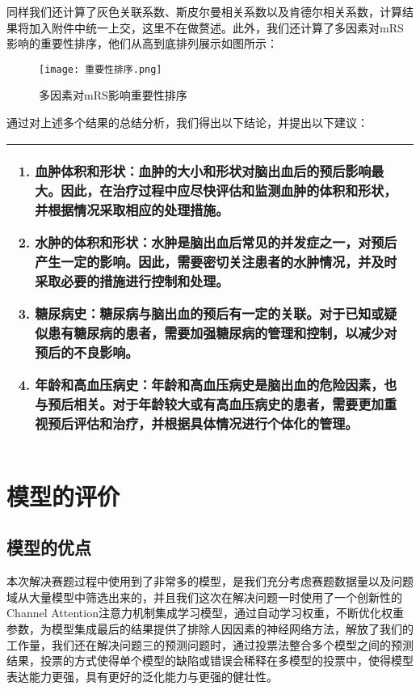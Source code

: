 \documentclass[bwprint]{gmcmthesis}
\begin{document}
				同样我们还计算了灰色关联系数、斯皮尔曼相关系数以及肯德尔相关系数，计算结果将加入附件中统一上交，这里不在做赘述。此外，我们还计算了多因素对mRS影响的重要性排序，他们从高到底排列展示如图所示：
				
				\begin{figure}[H]
					\centering
					\caption{多因素对mRS影响重要性排序}
					\texttt{[image: 重要性排序.png]}
				\end{figure}
				
				通过对上述多个结果的总结分析，我们得出以下结论，并提出以下建议：
				
				\begin{table}[H]
					\centering
					\begin{tabularx}{\textwidth}{|X|}
						\hline
						\begin{enumerate}
							\item 血肿体积和形状：血肿的大小和形状对脑出血后的预后影响最大。因此，在治疗过程中应尽快评估和监测血肿的体积和形状，并根据情况采取相应的处理措施。
							
							\item 水肿的体积和形状：水肿是脑出血后常见的并发症之一，对预后产生一定的影响。因此，需要密切关注患者的水肿情况，并及时采取必要的措施进行控制和处理。
							
							\item 糖尿病史：糖尿病与脑出血的预后有一定的关联。对于已知或疑似患有糖尿病的患者，需要加强糖尿病的管理和控制，以减少对预后的不良影响。
							
							\item 年龄和高血压病史：年龄和高血压病史是脑出血的危险因素，也与预后相关。对于年龄较大或有高血压病史的患者，需要更加重视预后评估和治疗，并根据具体情况进行个体化的管理。
							
						\end{enumerate}\\
						\hline
					\end{tabularx}
				\end{table}
				
				
	\section{模型的评价}
		\subsection{模型的优点}
			本次解决赛题过程中使用到了非常多的模型，是我们充分考虑赛题数据量以及问题域从大量模型中筛选出来的，并且我们这次在解决问题一时使用了一个创新性的Channel Attention注意力机制集成学习模型，通过自动学习权重，不断优化权重参数，为模型集成最后的结果提供了排除人因因素的神经网络方法，解放了我们的工作量，我们还在解决问题三的预测问题时，通过投票法整合多个模型之间的预测结果，投票的方式使得单个模型的缺陷或错误会稀释在多模型的投票中，使得模型表达能力更强，具有更好的泛化能力与更强的健壮性。
\end{document}

